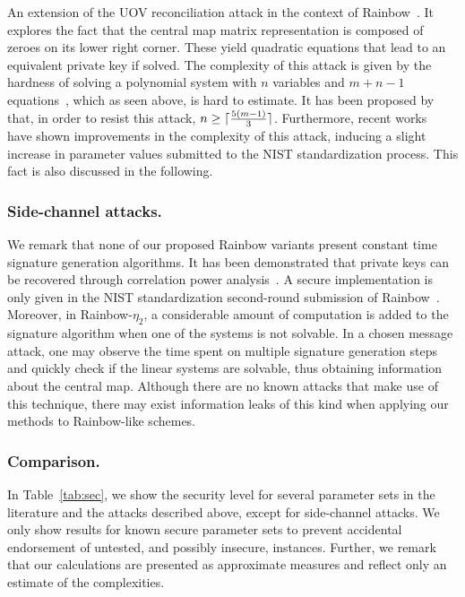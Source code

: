 \documentclass[12pt, a4paper, oneside]{memoir}
\DeclarePairedDelimiter{\ceil}{\lceil}{\rceil}
\theoremstyle{definition}
\begin{document}
An extension of the UOV reconciliation attack in the context of Rainbow~\cite{Ding:200806}. It explores the fact that the central map matrix representation is composed of zeroes on its lower right corner. These yield quadratic equations that lead to an equivalent private key if solved. The complexity of this attack is given by the hardness of solving a polynomial system with $n$ variables and $m + n - 1$ equations~\cite[Thm.~3.30]{Thomae:201306}, which as seen above, is hard to estimate. It has been proposed by~\cite{Petzoldt:201005} that, in order to resist this attack, $n \geq \ceil{\frac{5 (m - 1)}{3}}$. Furthermore, recent works~\cite{Perlner:202006,Nakamura:202006} have shown improvements in the complexity of this attack, inducing a slight increase in parameter values submitted to the NIST standardization process. This fact is also discussed in the following.

\subsubsection{Side-channel attacks.}

We remark that none of our proposed Rainbow variants present constant time signature generation algorithms. It has been demonstrated that private keys can be recovered through correlation power analysis~\cite{Park:201808}. A secure implementation is only given in the NIST standardization second-round submission of Rainbow~\cite{Ding:201901}. Moreover, in Rainbow-$\eta_2$, a considerable amount of computation is added to the signature algorithm when one of the systems is not solvable. In a chosen message attack, one may observe the time spent on multiple signature generation steps and quickly check if the linear systems are solvable, thus obtaining information about the central map. Although there are no known attacks that make use of this technique, there may exist information leaks of this kind when applying our methods to Rainbow-like schemes.

\subsubsection{Comparison.}

In Table~\ref{tab:sec}, we show the security level for several parameter sets in the literature and the attacks described above, except for side-channel attacks. We only show results for known secure parameter sets to prevent accidental endorsement of untested, and possibly insecure, instances. Further, we remark that our calculations are presented as approximate measures and reflect only an estimate of the complexities.
\end{document}

